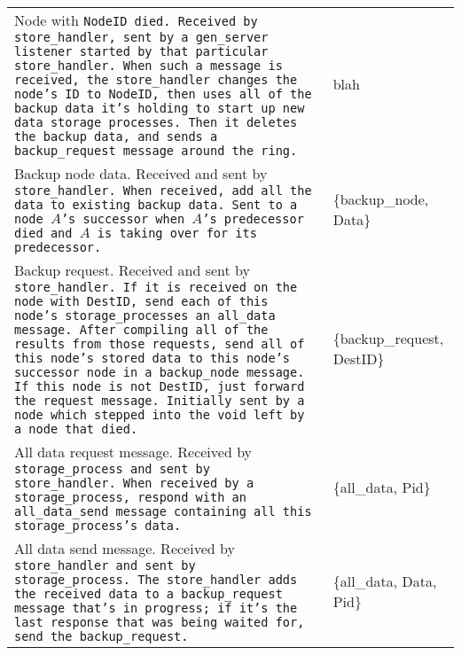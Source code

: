 \documentclass[12pt,letterpaper]{article}
\newcommand{\sh}{\tt{store\_handler}}
\renewcommand{\sp}{\tt{storage\_process}}
\newcommand{\gs}{\tt{gen\_server}}
\begin{document}
\begin{longtable}{p{4.5in}T}
Node with \tt{NodeID} died.  Received by \sh, sent by a \gs{} listener started by that particular \sh.  When such a message is received, the \sh{} changes the node's ID to \tt{NodeID}, then uses all of the backup data it's holding to start up new data storage processes.  Then it deletes the backup data, and sends a \tt{backup\_request} message around the ring. & blah \\

Backup node data.  Received and sent by \sh.  When received, add all the data to existing backup data.  Sent to a node $A$'s successor when $A$'s predecessor died and $A$ is taking over for its predecessor.  & \{backup\_node, Data\} \\

Backup request.  Received and sent by \sh.  If it is received on the node with \tt{DestID}, send each of this node's \sp es an \tt{all\_data} message.  After compiling all of the results from those requests, send all of this node's stored data to this node's successor node in a \tt{backup\_node} message.  If this node is not \tt{DestID}, just forward the request message.  Initially sent by a node which stepped into the void left by a node that died.  & \{backup\_request, DestID\} \\

All data request message.  Received by \sp{} and sent by \sh.  When received by a \sp, respond with an \tt{all\_data\_send} message containing all this \sp's data.  & \{all\_data, Pid\} \\

All data send message.  Received by \sh{} and sent by \sp.  The \sh{} adds the received data to a \tt{backup\_request} message that's in progress; if it's the last response that was being waited for, send the \tt{backup\_request}. & \{all\_data, Data, Pid\}




\end{longtable}
\end{document}
